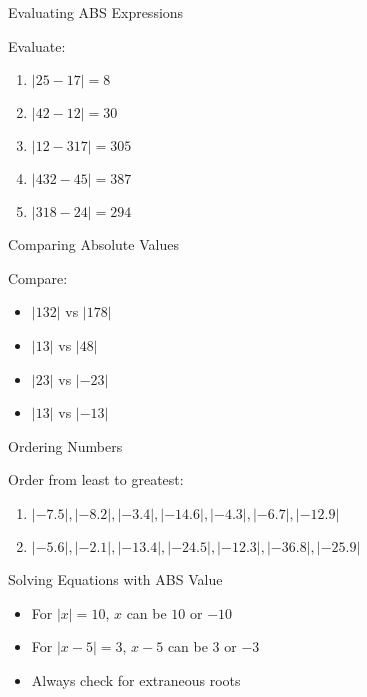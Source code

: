 \documentclass[aspectratio=169]{beamer}
\begin{document}
\begin{frame}{Evaluating ABS Expressions}
    \begin{tcolorbox}[colback=lightgray,colframe=primary,title=Practice]
        \footnotesize
        Evaluate:
        \begin{enumerate}[]
            \item $|25 - 17| = 8$
            \item $|42 - 12| = 30$
            \item $|12 - 317| = 305$
            \item $|432 - 45| = 387$
            \item $|318 - 24| = 294$
        \end{enumerate}
    \end{tcolorbox}
\end{frame}

\begin{frame}{Comparing Absolute Values}
    \begin{tcolorbox}[colback=lightgray,colframe=primary,title=Which is bigger?]
        \footnotesize
        Compare:
        \begin{itemize}
            \item $|132|$ vs $|178|$
            \item $|13|$ vs $|48|$
            \item $|23|$ vs $|-23|$
            \item $|13|$ vs $|-13|$
        \end{itemize}
    \end{tcolorbox}
\end{frame}

\begin{frame}{Ordering Numbers}
    \begin{tcolorbox}[colback=lightgray,colframe=primary,title=Example 2]
        \footnotesize
        Order from least to greatest:
        \begin{enumerate}[]
            \item $|-7.5|, |-8.2|, |-3.4|, |-14.6|, |-4.3|, |-6.7|, |-12.9|$
            \item $|-5.6|, |-2.1|, |-13.4|, |-24.5|, |-12.3|, |-36.8|, |-25.9|$
        \end{enumerate}
    \end{tcolorbox}
\end{frame}

\begin{frame}{Solving Equations with ABS Value}
    \begin{tcolorbox}[colback=lightgray,colframe=primary,title=Key Points]
        \footnotesize
        \begin{itemize}
            \item For $|x| = 10$, $x$ can be $10$ or $-10$
            \item For $|x-5| = 3$, $x-5$ can be $3$ or $-3$
            \item Always check for extraneous roots
        \end{itemize}
    \end{tcolorbox}
\end{frame}
\end{document}
